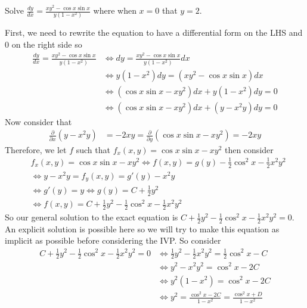 \documentclass[notes.tex]{subfiles}
\begin{document}
\begin{exercise}
    Solve $\frac{dy}{dx} = \frac{xy^2 - \cos x \sin x}{y(1 - x^2)}$ where when $x = 0$ that $y = 2$.
\end{exercise}
\begin{solution}
    First, we need to rewrite the equation to have a differential form on the LHS and $0$ on the right side so
    \begin{align*}
        \frac{dy}{dx} = \frac{xy^2 - \cos x \sin x}{y(1 - x^2)}
        &\iff dy = \frac{xy^2 - \cos x\sin x}{y(1 - x^2)}dx \\
        &\iff y(1 - x^2)dy = (xy^2 - \cos x\sin x)dx \\
        &\iff (\cos x\sin x - xy^2)dx + y(1 - x^2)dy = 0 \\
        &\iff (\cos x\sin x - xy^2)dx + (y - x^2 y)dy = 0
    \end{align*}
    Now consider that
    \begin{align*}
        \frac{\partial}{\partial x} (y - x^2 y)
        &= -2xy
        = \frac{\partial}{\partial y}(\cos x\sin x - xy^2) = -2xy
    \end{align*}
    Therefore, we let $f$ such that $f_x(x, y) = \cos x\sin x - xy^2$ then consider
    \begin{align*}
        &f_x(x, y) = \cos x\sin x - xy^2
        \iff f(x, y) = g(y) - \frac{1}{2}\cos^2 x - \frac{1}{2} x^2 y^2 \\
        &\iff y - x^2 y = f_y(x, y) = g'(y) - x^2 y \\
        &\iff g'(y) = y
        \iff g(y) = C + \frac{1}{2}y^2 \\
        &\iff f(x, y) = C + \frac{1}{2}y^2 - \frac{1}{2}\cos^2 x - \frac{1}{2} x^2 y^2
    \end{align*}
    So our general solution to the exact equation is $C + \frac{1}{2}y^2 - \frac{1}{2}\cos^2 x - \frac{1}{2} x^2 y^2 = 0$. \\
    An explicit solution is possible here so we will try to make this equation as implicit as possible before considering the IVP. So consider
    \begin{align*}
        C + \frac{1}{2}y^2 - \frac{1}{2}\cos^2 x - \frac{1}{2} x^2 y^2 = 0
        &\iff \frac{1}{2}y^2 - \frac{1}{2} x^2 y^2 = \frac{1}{2}\cos^2 x - C \\
        &\iff y^2 - x^2 y^2 = \cos^2 x - 2C \\
        &\iff y^2(1 - x^2) = \cos^2 x - 2C \\
        &\iff y^2 = \frac{\cos^2 x - 2C}{1 - x^2} = \frac{\cos^2 x + D}{1 - x^2}

\end{align*}
\end{solution}
\end{document}
